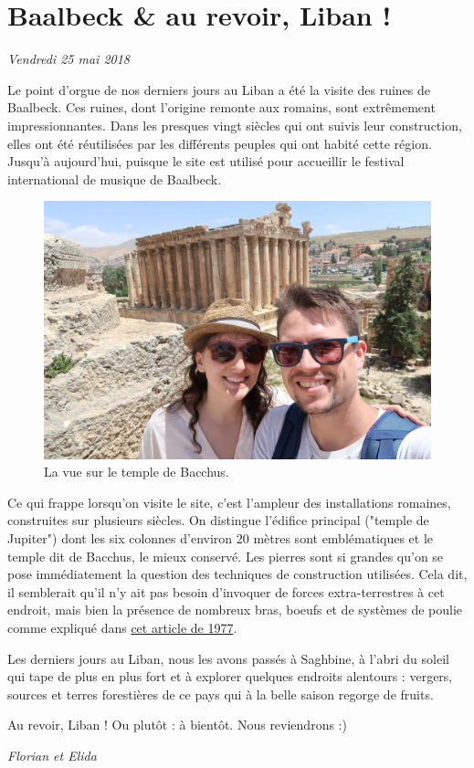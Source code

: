 \hypertarget{baalbeck-au-revoir-liban}{%
\section{Baalbeck \& au revoir, Liban
!}\label{baalbeck-au-revoir-liban}}

\emph{Vendredi 25 mai 2018}

Le point d'orgue de nos derniers jours au Liban a été la visite des
ruines de Baalbeck. Ces ruines, dont l'origine remonte aux romains, sont
extrêmement impressionnantes. Dans les presques vingt siècles qui ont
suivis leur construction, elles ont été réutilisées par les différents
peuples qui ont habité cette région. Jusqu'à aujourd'hui, puisque le
site est utilisé pour accueillir le festival international de musique de
Baalbeck.

\begin{figure}
\centering
\includegraphics{images/20180525_baalbeck.JPG}
\caption{La vue sur le temple de Bacchus.}
\end{figure}

Ce qui frappe lorsqu'on visite le site, c'est l'ampleur des
installations romaines, construites sur plusieurs siècles. On distingue
l'édifice principal ("temple de Jupiter") dont les six colonnes
d'environ 20 mètres sont emblématiques et le temple dit de Bacchus, le
mieux conservé. Les pierres sont si grandes qu'on se pose immédiatement
la question des techniques de construction utilisées. Cela dit, il
semblerait qu'il n'y ait pas besoin d'invoquer de forces
extra-terrestres à cet endroit, mais bien la présence de nombreux bras,
boeufs et de systèmes de poulie comme expliqué dans
\href{http://www.persee.fr/doc/syria_0039-7946_1977_num_54_1_6623}{cet
article de 1977}.

Les derniers jours au Liban, nous les avons passés à Saghbine, à l'abri
du soleil qui tape de plus en plus fort et à explorer quelques endroits
alentours : vergers, sources et terres forestières de ce pays qui à la
belle saison regorge de fruits.

Au revoir, Liban ! Ou plutôt : à bientôt. Nous reviendrons :)

\emph{Florian et Elida}
